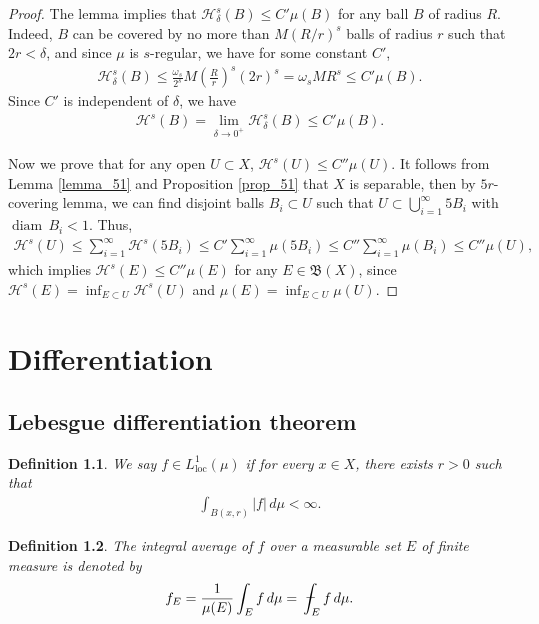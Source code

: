 \documentclass[11pt]{book}
\newtheorem{definition}{Definition}[chapter]
\theoremstyle{definition}
\numberwithin{equation}{chapter}
\def\H{{\mathcal H}}
\def\diam{{\operatorname{diam}\,}}
\def\avint{\,\ThisStyle{\ensurestackMath{%
  \stackinset{c}{.2\LMpt}{c}{1\LMpt}{\SavedStyle-}{\SavedStyle\phantom{\int}}}%
  \setbox0=\hbox{$\SavedStyle\int\,$}\kern-\wd0}\int}
\begin{document}
\begin{proof}
\medskip

The lemma implies that $\H^s_\delta(B) \leq C' \mu(B)$ for any ball $B$ of radius $R$. Indeed, $B$ can be covered by no more than $M(R/r)^s$ balls of radius $r$ such that $2r < \delta$, and since $\mu$ is $s$-regular, we have for some constant $C'$,
\begin{align*}
    \H^s_\delta(B) \leq \frac{\omega_s}{2^s} M \left(\frac{R}{r}\right)^s (2r)^s = \omega_s M R^s \leq C' \mu(B).
\end{align*}
Since $C'$ is independent of $\delta$, we have
\begin{align*}
    \H^s(B) = \lim_{\delta\to 0^+} \H^s_\delta(B) \leq C' \mu(B).
\end{align*}

Now we prove that for any open $U \subset X$, $\H^s(U) \leq C'' \mu(U)$. It follows from Lemma \ref{lemma_51} and Proposition \ref{prop_51} that $X$ is separable, then by $5r$-covering lemma, we can find disjoint balls $B_i \subset U$ such that $U \subset \bigcup^\infty_{i=1} 5B_i$ with $\diam B_i < 1$. Thus,
\begin{align*}
    \H^s(U) \leq \sum^\infty_{i=1} \H^s(5B_i) \leq C' \sum^\infty_{i=1} \mu(5B_i) \leq C'' \sum^\infty_{i=1} \mu(B_i) \leq C'' \mu(U),
\end{align*}
which implies $\H^s(E) \leq C'' \mu(E)$ for any $E \in \mathfrak{B}(X)$, since $\H^s(E) = \inf_{E \subset U}\H^s(U)$ and $\mu(E) = \inf_{E \subset U} \mu(U)$.
\end{proof}




\chapter{Differentiation}

\section{Lebesgue differentiation theorem}

\begin{definition}
We say $f \in L^1_{\operatorname{loc}}(\mu)$ if for every $x \in X$, there exists $r > 0$ such that 
\begin{align*}
    \int_{B(x,r)} \left|f\right| \,d\mu < \infty.
\end{align*}
\end{definition}

\medskip

\begin{definition}
The integral average of $f$ over a measurable set $E$ of finite measure is denoted by
\begin{align*}
    f_E = \frac{1}{\mu(E)} \int_E f \,d\mu = \avint_E f \,d\mu.
\end{align*}
\end{definition}
\end{document}
